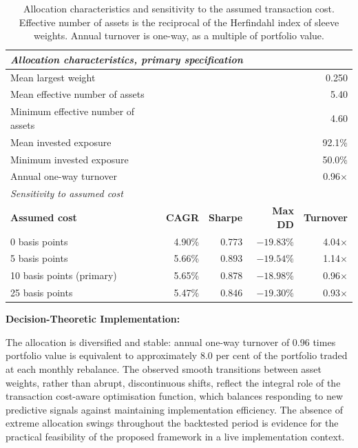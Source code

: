 \documentclass{singlecol-new}
\theoremstyle{TH}{
\newtheorem{lemma}{Lemma}
\newtheorem{theorem}[lemma]{Theorem}
\newtheorem{corrolary}[lemma]{Corrolary}
\newtheorem{conjecture}[lemma]{Conjecture}
\newtheorem{proposition}[lemma]{Proposition}
\newtheorem{claim}[lemma]{Claim}
\newtheorem{stheorem}[lemma]{Wrong Theorem}
\newtheorem{algorithm}{Algorithm}
}
\theoremstyle{THrm}{
\newtheorem{definition}{Definition}[section]
\newtheorem{question}{Question}[section]
\newtheorem{remark}{Remark}
\newtheorem{scheme}{Scheme}
}
\theoremstyle{THhit}{
\newtheorem{case}{Case}[section]
}
\begin{document}
\begin{table}[!ht]
\centering
\caption{Allocation characteristics and sensitivity to the assumed transaction cost.
Effective number of assets is the reciprocal of the Herfindahl index of sleeve weights.
Annual turnover is one-way, as a multiple of portfolio value.}
\label{tab:turnover}
\footnotesize
\begin{tabular}{p{4.8cm}rrrr}
\hline
\multicolumn{5}{l}{\textit{Allocation characteristics, primary specification}} \\
\hline
Mean largest weight & \multicolumn{4}{r}{0.250} \\
Mean effective number of assets & \multicolumn{4}{r}{5.40} \\
Minimum effective number of assets & \multicolumn{4}{r}{4.60} \\
Mean invested exposure & \multicolumn{4}{r}{92.1\%} \\
Minimum invested exposure & \multicolumn{4}{r}{50.0\%} \\
Annual one-way turnover & \multicolumn{4}{r}{0.96$\times$} \\
\hline
\multicolumn{5}{l}{\textit{Sensitivity to assumed cost}} \\
\hline
\textbf{Assumed cost} & \textbf{CAGR} & \textbf{Sharpe} & \textbf{Max DD} & \textbf{Turnover} \\
\hline
0 basis points & 4.90\% & 0.773 & $-19.83$\% & 4.04$\times$ \\
5 basis points & 5.66\% & 0.893 & $-19.54$\% & 1.14$\times$ \\
10 basis points (primary) & 5.65\% & 0.878 & $-18.98$\% & 0.96$\times$ \\
25 basis points & 5.47\% & 0.846 & $-19.30$\% & 0.93$\times$ \\
\hline
\end{tabular}
\end{table}

\textbf{Decision-Theoretic Implementation:}

The allocation is diversified and stable: annual one-way turnover of 0.96 times portfolio
value is equivalent to approximately 8.0 per cent of the portfolio traded at each monthly
rebalance. The observed smooth transitions between asset weights, rather than abrupt,
discontinuous shifts, reflect the integral role of the transaction cost-aware optimisation
function, which balances responding to new predictive signals against maintaining
implementation efficiency. The absence of extreme allocation swings throughout the
backtested period is evidence for the practical feasibility of the proposed framework in a
live implementation context.
\end{document}
